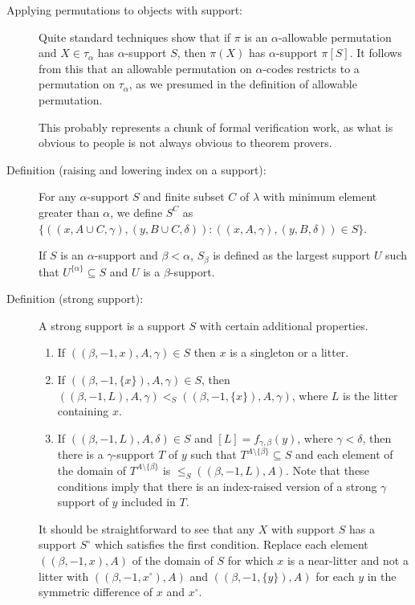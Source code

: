 \begin{description}
\item[Applying permutations to objects with support:]  Quite standard techniques show that if $\pi$ is an $\alpha$-allowable permutation and $X \in \tau_\alpha$ has $\alpha$-support $S$, then $\pi(X)$ has $\alpha$-support $\pi[S]$.   It follows from this that an allowable permutation on $\alpha$-codes restricts to a permutation on $\tau_\alpha$, as we presumed in the definition of allowable permutation.

This probably represents a chunk of formal verification work, as what is obvious to people is not always obvious to theorem provers.

\item[Definition (raising and lowering index on a support):]  For any $\alpha$-support $S$ and finite subset $C$ of $\lambda$ with minimum element greater than $\alpha$, we define $S^C$ as
$\{((x,A\cup C,\gamma),(y,B\cup C,\delta)):((x,A,\gamma),(y,B,\delta)) \in S\}$.

If $S$ is an $\alpha$-support and $\beta<\alpha$, $S_\beta$ is defined as the largest support $U$ such that $U^{\{\alpha\}} \subseteq S$ and $U$ is a $\beta$-support.

\item[Definition (strong support):]  A strong support is a support $S$ with certain additional properties.

\begin{enumerate}

\item  If $((\beta,-1,x),A,\gamma) \in S$ then $x$ is a singleton or a litter.

\item  If $((\beta,-1,\{x\}),A,\gamma) \in S$, then $((\beta,-1,L),A,\gamma) <_S ((\beta,-1,\{x\}),A,\gamma)$, where $L$ is the litter containing $x$.

\item  If $((\beta,-1,L),A,\delta) \in S$ and $[L]=f_{\gamma,\beta}(y)$, where $\gamma<\delta$, then there is a $\gamma$-support $T$ of $y$ such that $T^{A \setminus \{\beta\}} \subseteq S$ and each element of the domain of $T^{A \setminus \{\beta\}}$ is $\leq_S ((\beta,-1,L),A)$.  Note that these conditions imply that there is an index-raised version of a strong $\gamma$ support of $y$ included in $T$.

\end{enumerate}

It should be straightforward to see that any $X$ with support $S$ has a support $S^\circ$ which satisfies the first condition.  Replace each
element $((\beta,-1,x),A)$ of the domain of $S$ for which $x$ is a near-litter and not a litter with $((\beta,-1,x^\circ),A)$ and $((\beta,-1,\{y\}),A)$ for each $y$ in the symmetric difference of $x$ and $x^\circ$.


\end{description}
